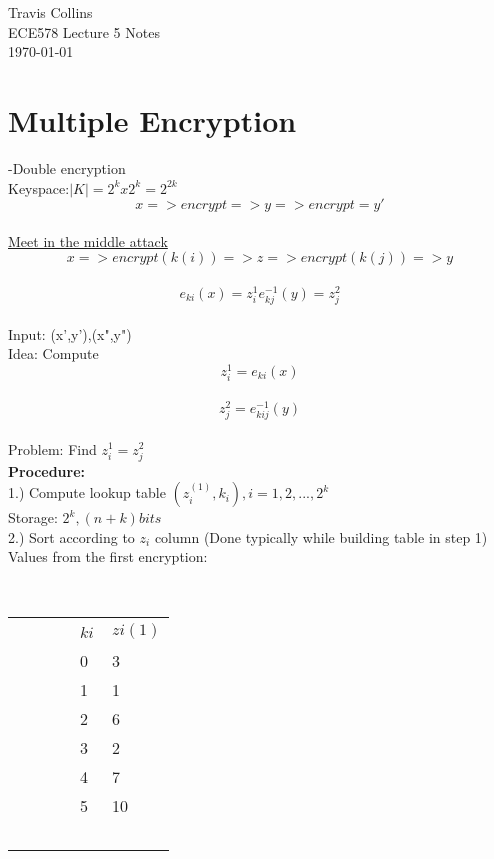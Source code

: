 \documentclass[12pt,letterpaper]{article}
\begin{document}
\linespread{1} %
\small \normalsize %
\begin{flushright}
Travis Collins \\
ECE578 Lecture 5 Notes \\
\today
\end{flushright}

\section{Multiple Encryption}
-Double encryption\\
Keyspace:\(\left|K\right|=2^k x 2^k=2^{2k}  \)\\
\[x => encrypt => y => encrypt =y'\]\\

\underline{Meet in the middle attack}\\
\[ x => encrypt(k(i)) => z => encrypt(k(j)) => y\]\\
\[e_{ki}(x)=z_{i}^1  e_{kj}^{-1}(y)=z_{j}^2\]\\

Input: (x',y'),(x",y")\\
Idea: Compute\\
\[z_{i}^1=e_{ki}(x)\]\\
\[z_{j}^2=e_{kij}^{-1}(y)\]\\
Problem: Find \(z_{i}^1=z_{j}^2\)\\

{\bf Procedure:}\\
1.) Compute lookup table \((z_{i}^{(1)},k_{i}),i=1,2,...,2^k\)\\
Storage: \(2^k,(n+k) bits\)\\
2.) Sort according to \(z_{i}\) column (Done typically while building table in step 1) \\

Values from the first encryption:\\
\begin{table}
    \begin{tabular}{|l|l|}
        $ki$ & $zi(1)$ \\ 
        0  & 3     \\ 
        1  & 1     \\ 
        2  & 6     \\ 
        3  & 2     \\ 
        4  & 7     \\ 
        5  & 10    \\
    \end{tabular}
\end{table}
\end{document}
